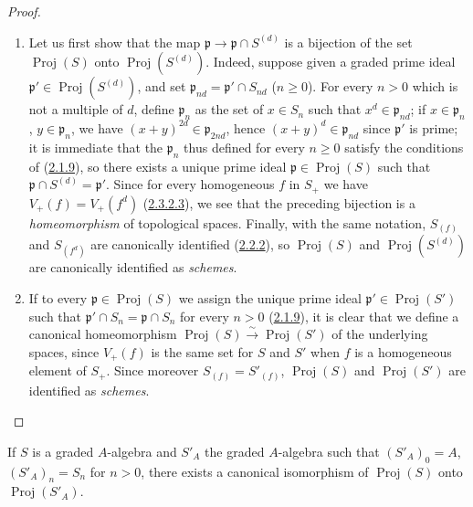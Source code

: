 \begin{proof}
\begin{enumerate}
  \item[\rm(i)] Let us first show that the map
    $\mathfrak{p}\to\mathfrak{p}\cap S^{(d)}$ is a bijection of
    the set $\operatorname{Proj}(S)$ onto
    $\operatorname{Proj}(S^{(d)})$. Indeed, suppose given a graded
    prime ideal $\mathfrak{p}'\in\operatorname{Proj}(S^{(d)})$, and set
    $\mathfrak{p}_{nd}=\mathfrak{p}'\cap S_{nd}$ ($n\geq0$). For every
    $n>0$ which is not a multiple of $d$, define $\mathfrak{p}_n$ as
    the set of $x\in S_n$ such that
    $x^d\in\mathfrak{p}_{nd}$; if $x\in\mathfrak{p}_n$,
    $y\in\mathfrak{p}_n$, we have
    $(x+y)^{2d}\in\mathfrak{p}_{2nd}$, hence
    $(x+y)^d\in\mathfrak{p}_{nd}$ since $\mathfrak{p}'$ is prime; it
    is immediate that the $\mathfrak{p}_n$ thus defined for every $n\geq0$
    satisfy the conditions of
    (\hyperref[II.2.1.9]{2.1.9}), so there exists a unique prime ideal
    $\mathfrak{p}\in\operatorname{Proj}(S)$ such that
    $\mathfrak{p}\cap S^{(d)}=\mathfrak{p}'$. Since for every homogeneous
    $f$ in $S_+$ we have
    $V_+(f)=V_+(f^d)$ (\hyperref[II.2.3.2.3]{2.3.2.3}), we see that the
    preceding bijection is a \emph{homeomorphism} of topological spaces.
    Finally, with the same notation, $S_{(f)}$ and
    $S_{(f^d)}$ are canonically identified
    (\hyperref[II.2.2.2]{2.2.2}), so $\operatorname{Proj}(S)$ and
    $\operatorname{Proj}(S^{(d)})$ are canonically identified as
    \emph{schemes}.
  \item[\rm(ii)] If to every
    $\mathfrak{p}\in\operatorname{Proj}(S)$ we assign the unique
    prime ideal $\mathfrak{p}'\in\operatorname{Proj}(S')$ such that
    $\mathfrak{p}'\cap S_n=\mathfrak{p}\cap S_n$ for every $n>0$
    (\hyperref[II.2.1.9]{2.1.9}), it is clear that we define a
    canonical homeomorphism
    $\operatorname{Proj}(S)\xrightarrow{\sim}\operatorname{Proj}(S')$ of the
    underlying spaces, since $V_+(f)$ is the same set for $S$ and
    $S'$ when $f$ is a homogeneous element of $S_+$. Since moreover
    $S_{(f)}=S'_{(f)}$, $\operatorname{Proj}(S)$ and
    $\operatorname{Proj}(S')$ are identified as \emph{schemes}.
\end{enumerate}
\end{proof}

\begin{corollary}[2.4.8]
\label{II.2.4.8}
If $S$ is a graded $A$-algebra and $S'_A$ the graded $A$-algebra such that
$(S'_A)_0=A$, $(S'_A)_n=S_n$ for $n>0$, there exists a canonical isomorphism
of $\operatorname{Proj}(S)$ onto $\operatorname{Proj}(S'_A)$.
\end{corollary}

